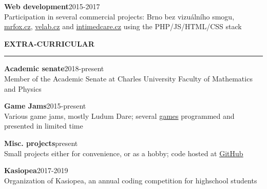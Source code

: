 \documentclass[11pt,a4paper]{article} %
\newcommand{\hSection}[1]{
    \medskip
    \MakeUppercase{\bf #1}
    \medskip
    \hrule
}
\newcommand{\hSubsection}[2]{{\bf #1}\hfill {#2}}
\begin{document}
\hSubsection{Web development}{2015-2017} \\
Participation in several commercial projects: Brno bez vizuálního smogu, \href{https://www.mrfox.cz/}{mrfox.cz}, \href{http://www.velab.cz/}{velab.cz} and \href{http://www.intimedcare.cz/}{intimedcare.cz} using the PHP/JS/HTML/CSS stack

\hSection{Extra-Curricular}
\hSubsection{Academic senate}{2018-present} \\
Member of the Academic Senate at Charles University Faculty of Mathematics and Physics

\hSubsection{Game Jams}{2015-present} \\
Various game jams, mostly Ludum Dare; several \href{https://github.com/allemansratten}{games} programmed and presented in limited time

\hSubsection{Misc. projects}{present} \\
Small projects either for convenience, or as a hobby; code hosted at \href{https://github.com/zouharvi}{GitHub}

\hSubsection{Kasiopea}{2017-2019} \\
Organization of Kasiopea, an annual coding competition for highschool students
\end{document}
